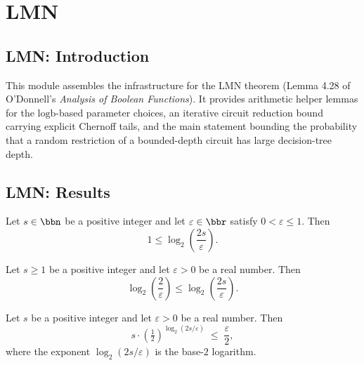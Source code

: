 \section{LMN}
\subsection*{LMN: Introduction}

This module assembles the infrastructure for the LMN theorem (Lemma 4.28 of
O'Donnell's \emph{Analysis of Boolean Functions}). It provides arithmetic helper
lemmas for the $\mathrm{logb}$-based parameter choices, an iterative circuit
reduction bound carrying explicit Chernoff tails, and the main statement bounding
the probability that a random restriction of a bounded-depth circuit has large
decision-tree depth.

\subsection*{LMN: Results}

\begin{lemma}
\label{LMN.logb_2s_div_eps_pos}
\leanok
{}
Let $s \in \bbn$ be a positive integer and let $\varepsilon \in \bbr$ satisfy $0 <
\varepsilon \le 1$. Then \[ 1 \le \log_2\!\left(\frac{2s}{\varepsilon}\right). \]
\end{lemma}

\begin{lemma}
\label{LMN.logb_2_div_eps_le_l}
\leanok
{}
Let $s \ge 1$ be a positive integer and let $\varepsilon > 0$ be a real number. Then
\[
\log_2\!\left(\frac{2}{\varepsilon}\right) \le
\log_2\!\left(\frac{2s}{\varepsilon}\right).
\]
\end{lemma}

\begin{lemma}
\label{LMN.size_times_two_pow_neg_l_le}
\leanok
{}
Let $s$ be a positive integer and let $\varepsilon > 0$ be a real number. Then
\[
s \cdot \left(\tfrac{1}{2}\right)^{\log_2(2s/\varepsilon)} \;\le\;
\frac{\varepsilon}{2},
\]
where the exponent $\log_2(2s/\varepsilon)$ is the base-$2$ logarithm.
\end{lemma}

